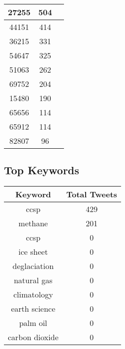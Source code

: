 \documentclass{article}\usepackage[T1]{fontenc}
\begin{document}
\begin{tabular}{|c|c|c|}
 \hline
27255 & 504\\ 
 \hline
44151 & 414\\ 
 \hline
36215 & 331\\ 
 \hline
54647 & 325\\ 
 \hline
51063 & 262\\ 
 \hline
69752 & 204\\ 
 \hline
15480 & 190\\ 
 \hline
65656 & 114\\ 
 \hline
65912 & 114\\ 
 \hline
82807 & 96\\ 
 \hline
\end{tabular}\subsection*{Top Keywords}\begin{tabular}{|c|c|}         \hline         Keyword & Total Tweets \\ 
 \hline
ccsp & 429\\ 
 \hline
methane & 201\\ 
 \hline
ccsp & 0\\ 
 \hline
ice sheet & 0\\ 
 \hline
deglaciation & 0\\ 
 \hline
natural gas & 0\\ 
 \hline
climatology & 0\\ 
 \hline
earth science & 0\\ 
 \hline
palm oil & 0\\ 
 \hline
carbon dioxide & 0\\ 
 \hline
\end{tabular}
\end{document}
